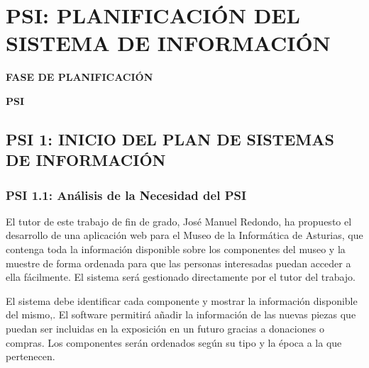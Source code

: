 \pagestyle{fancy}
\chapter{PSI: PLANIFICACIÓN DEL SISTEMA DE INFORMACIÓN}

	\vspace{2cm}	
	\begin{center}
	{\Large \textbf{FASE DE PLANIFICACIÓN} \par}
	\end{center}
	\vspace{5cm}
	
	\begin{center}
	\Huge \textbf{PSI}\par
	\end{center}

\newpage

\section{PSI 1: INICIO DEL PLAN DE SISTEMAS DE INFORMACIÓN}

\subsection{PSI 1.1: Análisis de la Necesidad del PSI} 
El tutor de este trabajo de fin de grado, José Manuel Redondo, ha propuesto el desarrollo de una aplicación web para el Museo de la Informática de Asturias, que contenga toda la información disponible sobre los componentes del museo y la muestre de forma ordenada para que las personas interesadas puedan acceder a ella fácilmente. El sistema será gestionado directamente por el tutor del trabajo.
\par El sistema debe identificar cada componente y mostrar la información disponible del mismo,. El software permitirá añadir la información de las nuevas piezas que puedan ser incluidas en la exposición en un futuro gracias a donaciones o compras. Los componentes serán ordenados según su tipo y la época a la que pertenecen. 

